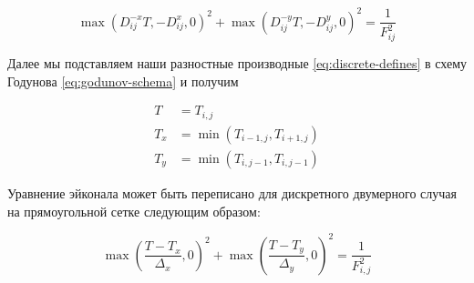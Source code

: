 \documentclass[a4paper,12pt]{article}
\begin{document}
\begin{equation}
  \label{eq:godunov-schema}
       \max (D^{-x}_{ij}T, -D^{x}_{ij},0)^2 + 
	  \max (D^{-y}_{ij}T, -D^{y}_{ij},0)^2
  = \frac{1}{F_{ij}^2}
\end{equation}







Далее мы подставляем наши разностные производные
\eqref{eq:discrete-defines} в схему Годунова \eqref{eq:godunov-schema}
и получим

\begin{equation}
  \begin{aligned}
  \label{eq:replaced}
    T &= T_{i,j}\\
    T_{x}&= \min(T_{i-1,j},T_{i+1,j})\\
    T_{y}&= \min(T_{i,j-1},T_{i,j-1})
      \end{aligned}
\end{equation}

Уравнение эйконала может быть переписано для дискретного двумерного
случая на прямоугольной сетке следующим образом:

\begin{equation}
  \label{eq:discrete-eikonal}
  \max \left( \frac {T-T_{x}}{\Delta_x},0 \right)^2+  \max \left( \frac
      {T-T_{y}}{\Delta_y},0\right)^2 = \frac{1}{F_{i,j}^2}
\end{equation}
\end{document}
